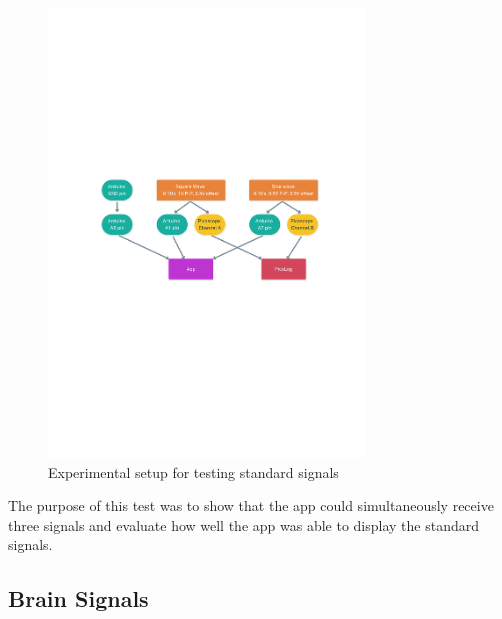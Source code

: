 \begin{figure}[h!]
\centering
\includegraphics[trim={3cm 11cm 3cm  11cm}, clip, width=0.75\textwidth]{./figures/test1.pdf}
\captionsetup{justification=centering}
\caption{Experimental setup for testing standard signals}
\label{fig: test1}
\end{figure}

The purpose of this test was to show that the app could simultaneously receive three signals and evaluate how well the app was able to display the standard signals.



\subsection{Brain Signals}